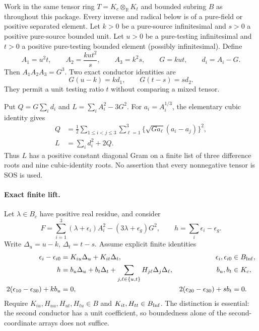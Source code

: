 Work in the same tensor ring $T=K_c\otimes_{\mathbb R}K_t$ and bounded
subring $B$ as throughout this package. Every inverse and radical below
is of a pure-field or positive separated element. Let $k>0$ be a
pure-source infinitesimal and $s>0$ a positive pure-source bounded unit.
Let $u>0$ be a pure-testing infinitesimal and $t>0$ a positive
pure-testing bounded element (possibly infinitesimal). Define
\[
 A_1=u^2t,\qquad A_2=\frac{ku t^2}{s},\qquad A_3=k^2s,
 \qquad G=kut,\qquad d_i=A_i-G.
\]
Then $A_1A_2A_3=G^3$. Two exact conductor identities are
\begin{equation}\label{p466b31015532:T3:conductors}
 G(u-k)=k d_1,\qquad G(t-s)=s d_2.
\end{equation}
They permit a unit testing ratio $t$ without comparing a mixed tensor.

Put $Q=G\sum_i d_i$ and $L=\sum_i A_i^2-3G^2$.
For $a_i=A_i^{1/3}$, the elementary cubic identity gives
\begin{align}\label{p466b31015532:T3:sos}
 Q&=\frac12\sum_{1\le i<j\le3}\sum_{\ell=1}^3
       \{\sqrt{G a_\ell}(a_i-a_j)\}^2,\\
 L&=\sum_i d_i^2+2Q.\nonumber
\end{align}
Thus $L$ has a positive constant diagonal Gram on a finite list of
three difference roots and nine cubic-identity roots. No assertion
that every nonnegative tensor is SOS is used.

\paragraph{Exact finite lift.}
Let $\lambda\in B_c$ have positive real residue, and consider
\[
 F=\sum_{i=1}^3(\lambda+\epsilon_i)A_i^2
       -(3\lambda+\epsilon_g)G^2,
 \qquad h=\sum_i\epsilon_i-\epsilon_g.
\]
Write $\Delta_u=u-k$, $\Delta_t=t-s$. Assume explicit finite identities
\begin{align}
 \epsilon_i-\epsilon_{i0}&=K_{iu}\Delta_u+K_{it}\Delta_t,
       &\epsilon_i,\epsilon_{i0}&\in B_{\rm Inf},\label{p466b31015532:T3:coeff}\\
 h&=b_u\Delta_u+b_t\Delta_t+
          \sum_{j,\ell\in\{u,t\}}H_{j\ell}\Delta_j\Delta_\ell,
       &b_u,b_t&\in K_c,\label{p466b31015532:T3:taylor}\\
 2(\epsilon_{10}-\epsilon_{30})+k b_u&=0,
 &2(\epsilon_{20}-\epsilon_{30})+s b_t&=0.\label{p466b31015532:T3:jets}
\end{align}
Require $K_{iu},H_{uu},H_{ut},H_{tu}\in B$ and
$K_{it},H_{tt}\in B_{\rm Inf}$. The distinction is essential:
the second conductor has a unit coefficient, so boundedness alone of
the second-coordinate arrays does not suffice.

